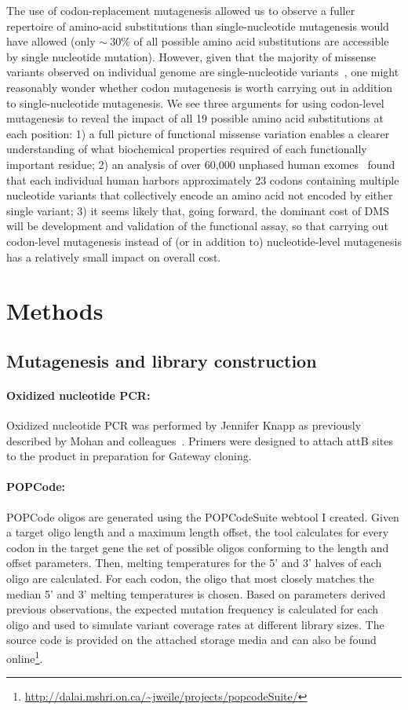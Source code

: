 The use of codon-replacement mutagenesis allowed us to observe a fuller repertoire of amino-acid substitutions than single-nucleotide mutagenesis would have allowed (only $\sim~30\%$ of all possible amino acid substitutions are accessible by single nucleotide mutation).  However, given that the majority of missense variants observed on individual genome are single-nucleotide variants~\cite{lek_analysis_2016}, one might reasonably wonder whether codon mutagenesis is worth carrying out in addition to single-nucleotide mutagenesis.  We see three arguments for using codon-level mutagenesis to reveal the impact of all 19 possible amino acid substitutions at each position:  1) a full picture of functional missense variation enables a clearer understanding of what biochemical properties required of each functionally important residue; 2) an analysis of over 60,000 unphased human exomes~\cite{lek_analysis_2016} found that each individual human harbors approximately 23 codons containing multiple nucleotide variants that collectively encode an amino acid not encoded by either single variant; 3) it seems likely that, going forward, the dominant cost of DMS will be development and validation of the functional assay, so that carrying out codon-level mutagenesis instead of (or in addition to) nucleotide-level mutagenesis has a relatively small impact on overall cost.


\section{Methods}

\subsection{Mutagenesis and library construction}

\paragraph{Oxidized nucleotide PCR: } Oxidized nucleotide PCR was performed by Jennifer Knapp as previously described by Mohan and colleagues~\cite{mohan_pcr_2011}. Primers were designed to attach attB sites to the product in preparation for Gateway cloning.

\paragraph{POPCode:} POPCode oligos are generated using the POPCodeSuite webtool I created. Given a target oligo length and a maximum length offset, the tool calculates for every codon in the target gene the set of possible oligos conforming to the length and offset parameters. Then, melting temperatures for the 5' and 3' halves of each oligo are calculated. For each codon, the oligo that most closely matches the median 5' and 3' melting temperatures is chosen. Based on parameters derived previous observations, the expected mutation frequency is calculated for each oligo and used to simulate variant coverage rates at different library sizes. The source code is provided on the attached storage media and can also be found online\footnote{
\url{http://dalai.mshri.on.ca/~jweile/projects/popcodeSuite/}
}.

